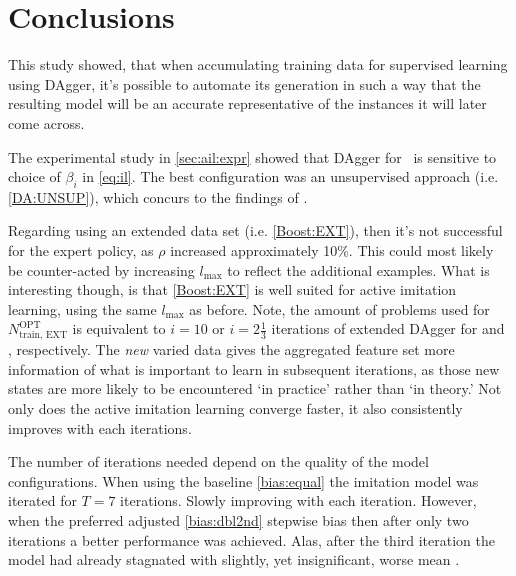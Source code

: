 

\section{Conclusions}
This study showed, that when accumulating training data for supervised  
learning using DAgger, it's possible to automate its generation in such a way 
that the resulting model will be an accurate representative of the instances 
it will later come across. 

The experimental study in \cref{sec:ail:expr} showed that DAgger for \jsp\ is 
sensitive to choice of $\beta_i$ in \cref{eq:il}. The best configuration was 
an unsupervised approach (i.e. \ref{DA:UNSUP}), which concurs to the findings of 
\cite{RossGB11}.

Regarding using an extended data set (i.e. \ref{Boost:EXT}), then it's not successful for the expert policy, as $\rho$ increased approximately 10\%. This could most likely be 
counter-acted by increasing $l_{\max}$ to reflect the additional examples.
What is interesting though, is that \ref{Boost:EXT} is well suited for 
active imitation learning, using the same $l_{\max}$ as before. 
Note, the amount of problems used for $N^{\text{OPT}}_{\text{train, EXT}}$ is 
equivalent to $i=10$ or $i=2\tfrac{1}{3}$ iterations of extended DAgger 
for \Problem[6\times5]{\train} and , respectively.
The \emph{new} varied data gives the aggregated feature set more information 
of what is important to learn in subsequent iterations, as those new states are 
more likely to be encountered `in practice' rather than `in theory.' Not only 
does the active imitation learning converge faster, it also consistently 
improves with each iterations.

The number of iterations needed depend on the quality of the model configurations. When using the baseline \ref{bias:equal} the imitation model was iterated for $T=7$ iterations. Slowly improving with each iteration.
However, when the preferred adjusted \ref{bias:dbl2nd} stepwise bias then after 
only two iterations a better performance was achieved. Alas, after the third 
iteration the model had already stagnated with slightly, yet insignificant, worse
mean \namerho.








